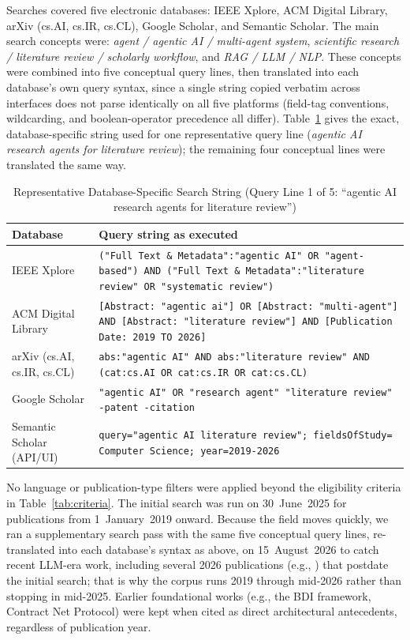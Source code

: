 \documentclass[sn-basic,Numbered]{sn-jnl}
\begin{document}
Searches covered five electronic databases: IEEE Xplore, ACM Digital
Library, arXiv (cs.AI, cs.IR, cs.CL), Google Scholar, and Semantic
Scholar. The main search concepts were: \emph{agent / agentic AI /
multi-agent system}, \emph{scientific research / literature review /
scholarly workflow}, and \emph{RAG / LLM / NLP}. These concepts were
combined into five conceptual query lines, then translated into each
database's own query syntax, since a single string copied verbatim
across interfaces does not parse identically on all five platforms
(field-tag conventions, wildcarding, and boolean-operator precedence
all differ). Table~\ref{tab:search_strings} gives the exact,
database-specific string used for one representative query line
(\emph{agentic AI research agents for literature review}); the
remaining four conceptual lines were translated the same way.

\begin{table}[h]
\centering
\caption{Representative Database-Specific Search String (Query Line 1
of 5: ``agentic AI research agents for literature review'')}
\label{tab:search_strings}
\renewcommand{\arraystretch}{1.2}
\begin{tabularx}{\columnwidth}{|l|X|}
\hline
\textbf{Database} & \textbf{Query string as executed} \\
\hline
IEEE Xplore &
\texttt{("Full Text \& Metadata":"agentic AI" OR "agent-based") AND
("Full Text \& Metadata":"literature review" OR "systematic review")} \\
\hline
ACM Digital Library &
\texttt{[Abstract: "agentic ai"] OR [Abstract: "multi-agent"] AND
[Abstract: "literature review"] AND [Publication Date: 2019 TO 2026]} \\
\hline
arXiv (cs.AI, cs.IR, cs.CL) &
\texttt{abs:"agentic AI" AND abs:"literature review" AND
(cat:cs.AI OR cat:cs.IR OR cat:cs.CL)} \\
\hline
Google Scholar &
\texttt{"agentic AI" OR "research agent" "literature review"
-patent -citation} \\
\hline
Semantic Scholar (API/UI) &
\texttt{query="agentic AI literature review"; fieldsOfStudy=
Computer Science; year=2019-2026} \\
\hline
\end{tabularx}
\end{table}

No language or publication-type filters were applied beyond the
eligibility criteria in Table~\ref{tab:criteria}. The initial search
was run on 30~June~2025 for publications from 1~January~2019 onward.
Because the field moves quickly, we ran a supplementary search pass
with the same five conceptual query lines, re-translated into each
database's syntax as above, on 15~August~2026 to catch recent LLM-era
work, including several 2026 publications (e.g., \cite{apuri2026maws})
that postdate the initial search; that is why the corpus runs 2019
through mid-2026 rather than stopping in mid-2025. Earlier foundational
works (e.g., the BDI framework, Contract Net Protocol) were kept when
cited as direct architectural antecedents, regardless of publication
year.
\end{document}
